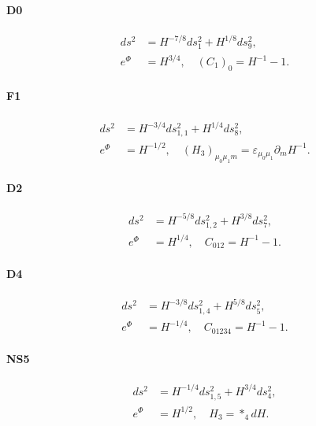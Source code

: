 \paragraph{D0}
\begin{equation}
\begin{aligned}
ds^2 &= H^{-7/8}ds_1^2 + H^{1/8}ds_9^2,\\
e^{\Phi} &= H^{3/4},\quad
(C_1)_0 = H^{-1}-1.
\end{aligned}
\end{equation}

\paragraph{F1}
\begin{equation}
\begin{aligned}
ds^2 
&= H^{-3/4}ds_{1,1}^2 + H^{1/4}ds_8^2,\\
e^{\Phi}
&= H^{-1/2},\quad
(H_3)_{\mu_0\mu_1 m} = \varepsilon_{\mu_0 \mu_1} \partial_m H^{-1}.
\end{aligned}
\end{equation}

\paragraph{D2}
\begin{equation}
\begin{aligned}
ds^2
&= H^{-5/8}ds_{1,2}^2 + H^{3/8}ds_7^2,\\
e^{\Phi}
&= H^{1/4},\quad
C_{012} = H^{-1}-1.
\end{aligned}
\end{equation}

\paragraph{D4}
\begin{equation}
\begin{aligned}
ds^2
&= H^{-3/8}ds_{1,4}^2 + H^{5/8}ds_5^2,\\
e^{\Phi}
&= H^{-1/4},\quad
C_{01234} = H^{-1}-1.
\end{aligned}
\end{equation}

\paragraph{NS5}
\begin{equation}
\begin{aligned}
ds^2 
&= H^{-1/4}ds_{1,5}^2 + H^{3/4}ds_4^2,\\
e^{\Phi}
&= H^{1/2},\quad H_3 = *_4 dH.
\end{aligned}
\end{equation}


